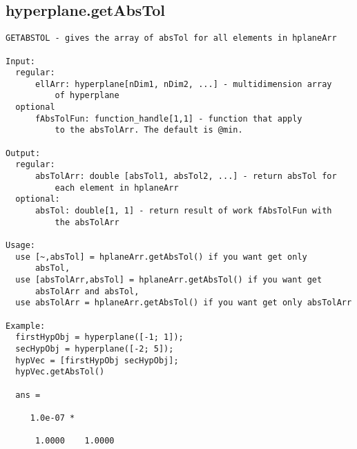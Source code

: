 \subsection{\texorpdfstring{hyperplane.getAbsTol}{getAbsTol}}\label{method:hyperplane.getAbsTol}
\begin{verbatim}
GETABSTOL - gives the array of absTol for all elements in hplaneArr

Input:
  regular:
      ellArr: hyperplane[nDim1, nDim2, ...] - multidimension array
          of hyperplane
  optional
      fAbsTolFun: function_handle[1,1] - function that apply
          to the absTolArr. The default is @min.

Output:
  regular:
      absTolArr: double [absTol1, absTol2, ...] - return absTol for
          each element in hplaneArr
  optional:
      absTol: double[1, 1] - return result of work fAbsTolFun with
          the absTolArr

Usage:
  use [~,absTol] = hplaneArr.getAbsTol() if you want get only
      absTol,
  use [absTolArr,absTol] = hplaneArr.getAbsTol() if you want get
      absTolArr and absTol,
  use absTolArr = hplaneArr.getAbsTol() if you want get only absTolArr

Example:
  firstHypObj = hyperplane([-1; 1]);
  secHypObj = hyperplane([-2; 5]);
  hypVec = [firstHypObj secHypObj];
  hypVec.getAbsTol()

  ans =

     1.0e-07 *

      1.0000    1.0000
\end{verbatim}
